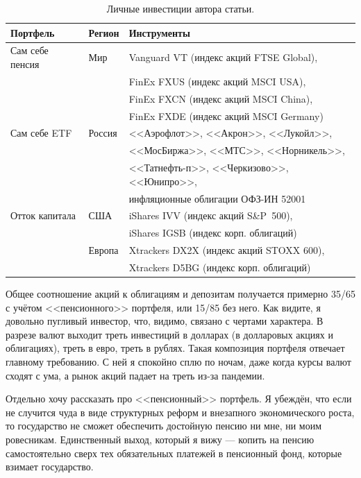 \begin{table}[h]
\centering
\begin{tabular}{l|l|l}
Портфель        & Регион & Инструменты \\
\hline
Сам себе пенсия & Мир    & Vanguard VT (индекс акций FTSE Global), \\
                &        & FinEx FXUS (индекс акций MSCI USA), \\ 
                &        & FinEx FXCN (индекс акций MSCI China), \\
                &        & FinEx FXDE (индекс акций MSCI Germany) \\
\hline
Сам себе ETF    & Россия & <<Аэрофлот>>, <<Акрон>>, <<Лукойл>>, \\
                &        & <<МосБиржа>>, <<МТС>>, <<Норникель>>,\\
                &        & <<Татнефть-п>>, <<Черкизово>>, <<Юнипро>>, \\
                &        & инфляционные облигации ОФЗ-ИН 52001 \\
\hline
Отток капитала  & США    & iShares IVV (индекс акций S\&P~500), \\
                &        & iShares IGSB (индекс корп. облигаций) \\
\cline{2-3}
                & Европа & Xtrackers DX2X (индекс акций STOXX 600), \\
                &        & Xtrackers D5BG (индекс корп. облигаций)
\end{tabular}
\caption{Личные инвестиции автора статьи.}
\label{personal_portfolios}
\end{table}

Общее соотношение акций к облигациям и депозитам получается примерно 35/65 с 
учётом <<пенсионного>> портфеля, или 15/85 без него. Как видите, я довольно 
пугливый инвестор, что, видимо, связано с чертами характера. В разрезе валют 
выходит треть инвестиций в долларах (в долларовых акциях и облигациях), треть в 
евро, треть в рублях. Такая композиция портфеля отвечает главному требованию. С 
ней я спокойно сплю по ночам, даже когда курсы валют сходят с ума, а рынок 
акций падает на треть из-за пандемии.

Отдельно хочу рассказать про <<пенсионный>> портфель. Я убеждён, что если не 
случится чуда в виде структурных реформ и внезапного экономического роста, то 
государство не сможет обеспечить достойную пенсию ни мне, ни моим ровесникам. 
Единственный выход, который я вижу --- копить на пенсию самостоятельно сверх 
тех обязательных платежей в пенсионный фонд, которые взимает государство.

